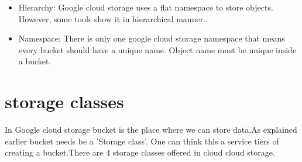 \documentclass[9pt,twocolumn,twoside]{styles/osajnl}
\begin{document}
\begin{itemize}
\item Hierarchy:
Google cloud storage uses a flat namespace to store objects. However, some tools show it in hierarchical manner.. 
 
\item Namespace:
There is only one google cloud storage namespace that means every bucket should have a unique name. Object name must be unique inside a bucket.

\end{itemize}

\section{storage classes}

In Google cloud storage bucket is the place where we can store data.As explained earlier bucket needs be a 'Storage class'. One can think this a service tiers of creating a bucket.There are 4 storage classes offered in cloud cloud storage.
\end{document}
